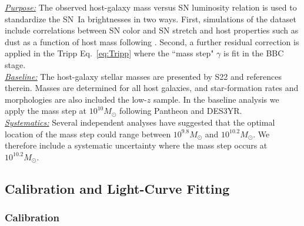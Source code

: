 \documentclass[twocolumn]{aastex63}
\begin{document}
\noindent\uline{\textit{Purpose:}} The observed host-galaxy mass versus SN luminosity relation is used to standardize the SN~Ia brightnesses in two ways. First, simulations of the dataset include correlations between SN color {and SN stretch} and host properties such as dust as a function of host mass following \cite{popovic21b}. Second, a further residual correction is applied in the Tripp Eq.~\ref{eq:Tripp} where the ``mass step" $\gamma$ is fit in the BBC stage. \\
\uline{\textit{Baseline:}} The host-galaxy stellar masses are presented by S22 and references therein. Masses are determined for all host galaxies, and star-formation rates and morphologies are also included the low-$z$ sample. In the baseline analysis we apply the mass step at $10^{10}M_\odot$ following Pantheon and DES3YR. \\
\uline{\textit{Systematics:}} Several independent analyses \citep{Sullivan2010,Childress_2013,Kelsey2020} have suggested that the optimal location of the mass step could range between $10^{9.8}M_\odot$ and $10^{10.2}M_\odot$. We therefore include a systematic uncertainty where the mass step occurs at $10^{10.2}M_\odot$. \\





\subsection{Calibration and Light-Curve Fitting}
\subsubsection{\textbf{Calibration}}
\label{subsubsection:calibration}
\end{document}

